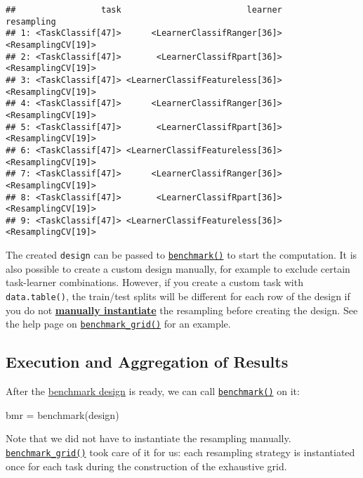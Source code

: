 \documentclass[
]{scrbook}
\newenvironment{Shaded}{\begin{snugshade}}{\end{snugshade}}
\newcommand{\FunctionTok}[1]{\textcolor[rgb]{0.00,0.00,0.00}{#1}}
\newcommand{\NormalTok}[1]{#1}
\newcommand{\OtherTok}[1]{\textcolor[rgb]{0.56,0.35,0.01}{#1}}
\renewenvironment{Shaded} {\begin{snugshade}\small} {\end{snugshade}}
\begin{document}
\begin{verbatim}
##                 task                         learner         resampling
## 1: <TaskClassif[47]>      <LearnerClassifRanger[36]> <ResamplingCV[19]>
## 2: <TaskClassif[47]>       <LearnerClassifRpart[36]> <ResamplingCV[19]>
## 3: <TaskClassif[47]> <LearnerClassifFeatureless[36]> <ResamplingCV[19]>
## 4: <TaskClassif[47]>      <LearnerClassifRanger[36]> <ResamplingCV[19]>
## 5: <TaskClassif[47]>       <LearnerClassifRpart[36]> <ResamplingCV[19]>
## 6: <TaskClassif[47]> <LearnerClassifFeatureless[36]> <ResamplingCV[19]>
## 7: <TaskClassif[47]>      <LearnerClassifRanger[36]> <ResamplingCV[19]>
## 8: <TaskClassif[47]>       <LearnerClassifRpart[36]> <ResamplingCV[19]>
## 9: <TaskClassif[47]> <LearnerClassifFeatureless[36]> <ResamplingCV[19]>
\end{verbatim}

The created \texttt{design} can be passed to \href{https://mlr3.mlr-org.com/reference/benchmark.html}{\texttt{benchmark()}} to start the computation.
It is also possible to create a custom design manually, for example to exclude certain task-learner combinations.
However, if you create a custom task with \texttt{data.table()}, the train/test splits will be different for each row of the design if you do not \protect\hyperlink{resampling-inst}{\textbf{manually instantiate}} the resampling before creating the design.
See the help page on \href{https://mlr3.mlr-org.com/reference/benchmark_grid.html}{\texttt{benchmark\_grid()}} for an example.

\hypertarget{bm-exec}{%
\subsection{Execution and Aggregation of Results}\label{bm-exec}}

After the \protect\hyperlink{bm-design}{benchmark design} is ready, we can call \href{https://mlr3.mlr-org.com/reference/benchmark.html}{\texttt{benchmark()}} on it:

\begin{Shaded}
\begin{Highlighting}[]
\NormalTok{bmr }\OtherTok{=} \FunctionTok{benchmark}\NormalTok{(design)}
\end{Highlighting}
\end{Shaded}

Note that we did not have to instantiate the resampling manually.
\href{https://mlr3.mlr-org.com/reference/benchmark_grid.html}{\texttt{benchmark\_grid()}} took care of it for us: each resampling strategy is instantiated once for each task during the construction of the exhaustive grid.
\end{document}

